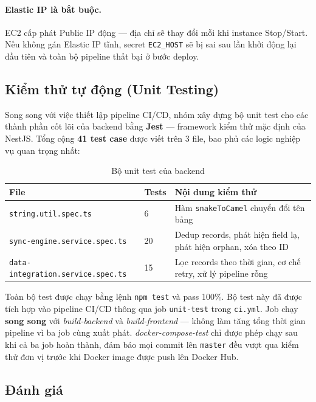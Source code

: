 \paragraph{Elastic IP là bắt buộc.}
EC2 cấp phát Public IP động --- địa chỉ sẽ thay đổi mỗi khi instance
Stop/Start. Nếu không gán Elastic IP tĩnh, secret \texttt{EC2\_HOST} sẽ
bị sai sau lần khởi động lại đầu tiên và toàn bộ pipeline thất bại ở bước
deploy.

\subsection{Kiểm thử tự động (Unit Testing)}

Song song với việc thiết lập pipeline CI/CD, nhóm xây dựng bộ unit test
cho các thành phần cốt lõi của backend bằng \textbf{Jest} --- framework
kiểm thử mặc định của NestJS. Tổng cộng \textbf{41 test case} được viết
trên 3 file, bao phủ các logic nghiệp vụ quan trọng nhất:

\begin{table}[H]
\centering
\caption{Bộ unit test của backend}
\label{tab:unit-tests}
\begin{tabular}{llp{7cm}}
\hline
\textbf{File} & \textbf{Tests} & \textbf{Nội dung kiểm thử} \\
\hline
\texttt{string.util.spec.ts}           & 6  & Hàm \texttt{snakeToCamel} chuyển đổi tên bảng \\
\texttt{sync-engine.service.spec.ts}   & 20 & Dedup records, phát hiện field lạ, phát hiện orphan, xóa theo ID \\
\texttt{data-integration.service.spec.ts} & 15 & Lọc records theo thời gian, cơ chế retry, xử lý pipeline rỗng \\
\hline
\end{tabular}
\end{table}

Toàn bộ test được chạy bằng lệnh \texttt{npm test} và pass 100\%.
Bộ test này đã được tích hợp vào pipeline CI/CD thông qua job \texttt{unit-test}
trong \texttt{ci.yml}. Job chạy \textbf{song song} với \textit{build-backend}
và \textit{build-frontend} --- không làm tăng tổng thời gian pipeline vì ba job
cùng xuất phát. \textit{docker-compose-test} chỉ được phép chạy sau khi cả ba
job hoàn thành, đảm bảo mọi commit lên \texttt{master} đều vượt qua kiểm thử
đơn vị trước khi Docker image được push lên Docker Hub.

\subsection{Đánh giá}

